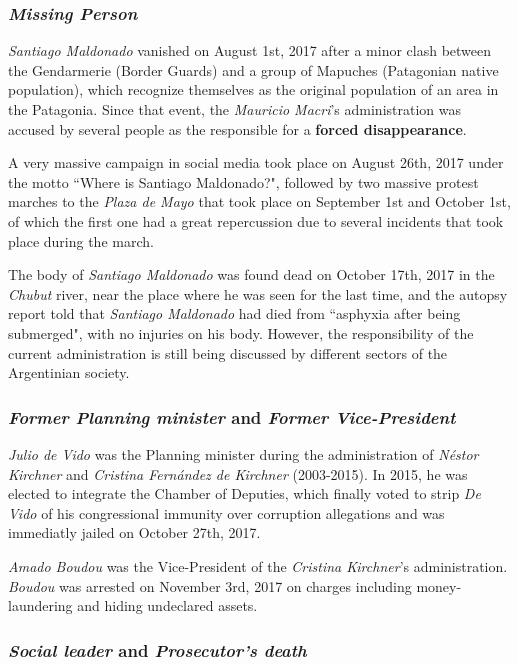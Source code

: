 \documentclass{bmcart}
\begin{document}
\subsubsection*{\emph{Missing Person}}
\par \emph{Santiago Maldonado} vanished on August 1st, 2017 after a minor clash between the Gendarmerie (Border Guards) and a group of Mapuches (Patagonian native population), which recognize themselves as the original population of an area in the Patagonia.
Since that event, the \emph{Mauricio Macri}'s administration was accused by several people as the responsible for a \textbf{forced disappearance}. 
\par A very massive campaign in social media took place on August 26th, 2017 under the motto ``Where is Santiago Maldonado?", followed by two massive protest marches to the \emph{Plaza de Mayo} that took place on September 1st and October 1st, of which the first one had a great repercussion due to several incidents that took place during the march.
\par The body of \emph{Santiago Maldonado} was found dead on October 17th, 2017 in the \emph{Chubut} river, near the place where he was seen for the last time, and the autopsy report told that \emph{Santiago Maldonado} had died from ``asphyxia after being submerged", with no injuries on his body. 
However, the responsibility of the current administration is still being discussed by different sectors of the Argentinian society.

\subsubsection*{\emph{Former Planning minister} and \emph{Former Vice-President}}

\par \emph{Julio de Vido} was the Planning minister during the administration of \emph{N\'estor Kirchner} and \emph{Cristina Fern\'andez de Kirchner} (2003-2015). In 2015, he was elected to integrate the Chamber of Deputies, which finally voted to strip \emph{De Vido} of his congressional immunity over corruption allegations and was immediatly jailed on October 27th, 2017.

\par \emph{Amado Boudou} was the Vice-President of the \emph{Cristina Kirchner}'s administration.
\emph{Boudou} was arrested on November 3rd, 2017 on charges including money-laundering and hiding undeclared assets.

\subsubsection*{\emph{Social leader} and \emph{Prosecutor's death}}
\end{document}
